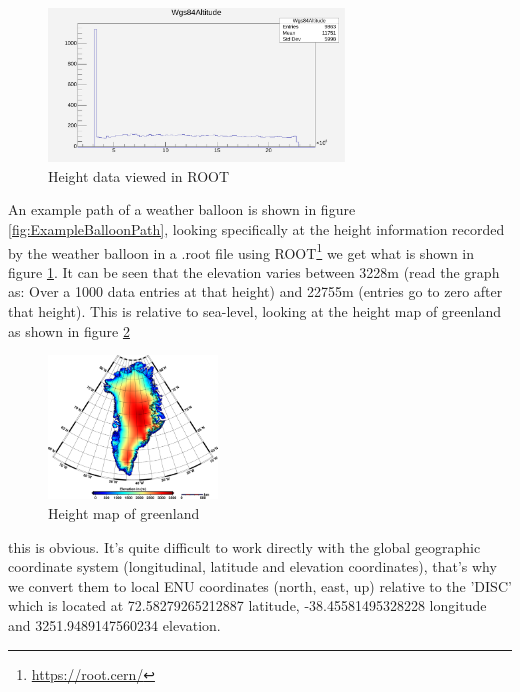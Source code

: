 \documentclass[11pt,a4paper,faculty=we,language=en,doctype=report]{cls/ugent-doc}
\begin{document}
\begin{figure}
  \centering
  \includegraphics[width=0.7\textwidth]{BobsWeatherBalloonHeight.pdf}
  \caption{Height data viewed in ROOT}
  \label{fig:BobsWeatherBalloonHeight}
\end{figure}
An example path of a weather balloon is shown in figure
\ref{fig:ExampleBalloonPath}, looking specifically at the height information
recorded by the weather balloon in a .root file using
ROOT\footnote{\url{https://root.cern/}} we get what is shown in figure
\ref{fig:BobsWeatherBalloonHeight}. It can be seen that the elevation varies
between 3228m (read the graph as: Over a 1000 data entries at that height) and
22755m (entries go to zero after that height).  This is relative to sea-level,
looking at the height map of greenland as shown in figure
\ref{fig:HeightMapGreenland}
\begin{figure}
  \centering
  \includegraphics[width=0.4\textwidth]{GreenlandHeight.png}
  \caption{Height map of greenland}
  \label{fig:HeightMapGreenland}
\end{figure}
this is obvious.  It's quite difficult to work directly with the global geographic
coordinate system (longitudinal, latitude and elevation coordinates),
that's why we convert them to local ENU coordinates (north, east, up)
relative to the 'DISC' which is located at 72.58279265212887 latitude,
-38.45581495328228 longitude and 3251.9489147560234 elevation.
\end{document}

